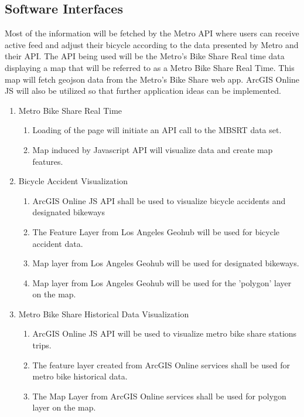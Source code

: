 \documentclass[a4paper,12pt]{article}
\begin{document}
\subsection{Software Interfaces}
Most of the information will be fetched by the Metro API where users can receive active feed and adjust their bicycle according to the data presented by Metro and their API. The API being used will be the Metro's Bike Share Real time data displaying a map that will be referred to as a Metro Bike Share Real Time. This map will fetch geojson data from the Metro's Bike Share web app. ArcGIS Online JS will also be utilized so that further application ideas can be implemented.
\begin{enumerate}
    \item Metro Bike Share Real Time
    \begin{enumerate}
        \item Loading of the page will initiate an API call to the MBSRT data set.
        \item Map induced by Javascript API will visualize data and create map features.
    \end{enumerate}
    \item Bicycle Accident Visualization
    \begin{enumerate}
        \item ArcGIS Online JS API shall be used to visualize bicycle accidents and designated bikeways
        \item The Feature Layer from Los Angeles Geohub will be used for bicycle accident data.
        \item Map layer from Los Angeles Geohub will be used for designated bikeways.
        \item Map layer from Los Angeles Geohub will be used for the 'polygon' layer on the map.
    \end{enumerate}
    \item Metro Bike Share Historical Data Visualization
    \begin{enumerate}
        \item ArcGIS Online JS API will be used to visualize metro bike share stations trips.
        \item The feature layer created from ArcGIS Online services shall be used for metro bike historical data.
        \item The Map Layer from ArcGIS Online services shall be used for polygon layer on the map.
    \end{enumerate}
\end{enumerate}
\end{document}
